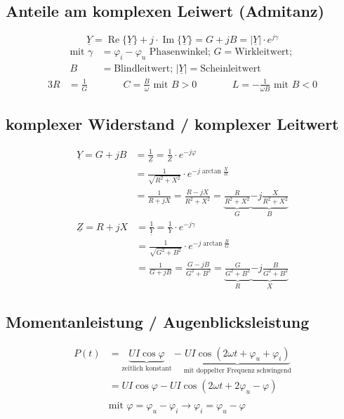 \subsection*{Anteile am komplexen Leiwert (Admitanz)}
\[\underline{Y} = \operatorname{Re}\{\underline{Y}\} + j \cdot \operatorname{Im}\{\underline{Y}\} = G + jB = \left|\underline{Y}\right| \cdot e^{j\gamma}\]
\begin{align*}
\text{mit }\gamma &= \varphi_i - \varphi_u \text{ Phasenwinkel; } G = \text{Wirkleitwert; } \\ B &= \text{Blindleitwert; } \left|\underline{Y}\right| = \text{Scheinleitwert }
\end{align*}
\begin{alignat*}{3}
R&=\frac{1}{G} &\quad\quad& C=\frac{B}{\omega} \text{ mit } B>0 &\quad\quad& L=-\frac{1}{\omega B} \text{ mit } B<0
\end{alignat*}

\subsection*{komplexer Widerstand / komplexer Leitwert}
\begin{align*}
\underline{Y} = G + jB &= \frac{1}{\underline{Z}} = \frac{1}{Z} \cdot e^{-j\varphi} \\
	      &= \frac{1}{\sqrt{R^2 + X^2}} \cdot e^{-j\arctan\frac{X}{R}} \\
	      &= \frac{1}{R + jX} = \frac{R-jX}{R^2 + X^2} = \underbrace{\frac{R}{R^2 + X^2}}_G \underbrace{-j\frac{X}{R^2 + X^2}}_B
\end{align*}
\begin{align*}
\underline{Z} = R + jX &= \frac{1}{\underline{Y}} = \frac{1}{Y} \cdot e^{-j\gamma} \\
	      &= \frac{1}{\sqrt{G^2 + B^2}} \cdot e^{-j\arctan\frac{B}{G}} \\
	      &= \frac{1}{G + jB} = \frac{G-jB}{G^2 + B^2} = \underbrace{\frac{G}{G^2 + B^2}}_R \underbrace{-j\frac{B}{G^2 + B^2}}_X
\end{align*}

\subsection*{Momentanleistung / Augenblicksleistung}
\begin{align*}
P\left(t\right) &= \underbrace{UI \cos \varphi}_{\text{zeitlich konstant}} - \underbrace{UI \cos \left(2 \omega t + \varphi_u + \varphi_i\right)}_{\text{mit doppelter Frequenz schwingend}} \\
		&= UI \cos \varphi - UI \cos \left(2 \omega t + 2\varphi_u - \varphi\right) \\ \\
		&\text{mit } \varphi = \varphi_u - \varphi_i \rightarrow \varphi_i = \varphi_u - \varphi
\end{align*}

